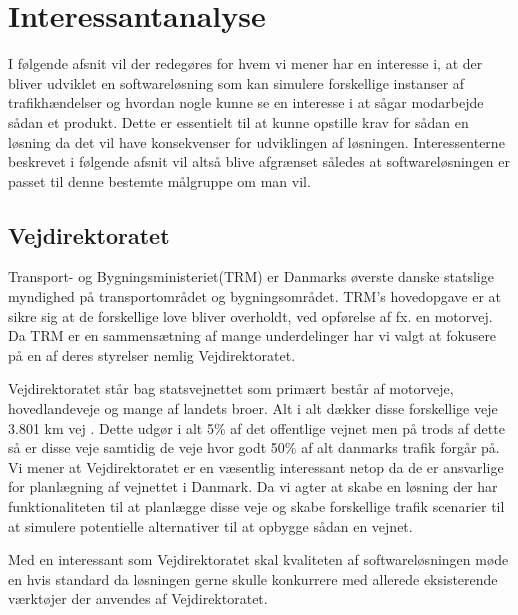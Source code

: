 \chapter{Interessantanalyse}\label{Interessentanalyse}

I følgende afsnit vil der redegøres for hvem vi mener har en interesse i, at der bliver udviklet en softwareløsning som kan simulere forskellige instanser af trafikhændelser og hvordan nogle kunne se en interesse i at sågar modarbejde sådan et produkt. Dette er essentielt til at kunne opstille krav for sådan en løsning da det vil have konsekvenser for udviklingen af løsningen. Interessenterne beskrevet i følgende afsnit vil altså blive afgrænset således at softwareløsningen er passet til denne bestemte målgruppe om man vil.

\section {Vejdirektoratet}\label{TRM}

Transport- og Bygningsministeriet(TRM) er Danmarks øverste danske statslige myndighed på transportområdet og bygningsområdet. TRM’s hovedopgave er at sikre sig at de forskellige love bliver overholdt, ved opførelse af fx. en motorvej. Da TRM er en sammensætning af mange underdelinger har vi valgt at fokusere på en af deres styrelser nemlig Vejdirektoratet.

\vspace{5mm}

Vejdirektoratet står bag statsvejnettet som primært består af motorveje, hovedlandeveje og mange af landets broer. Alt i alt dækker disse forskellige veje 3.801 km vej \cite{Vejdirektoratet}. Dette udgør i alt 5\% af det offentlige vejnet men på trods af dette så er disse veje samtidig de veje hvor godt 50\% af alt danmarks trafik forgår på. Vi mener at Vejdirektoratet er en væsentlig interessant netop da de er ansvarlige for planlægning af vejnettet i Danmark. Da vi agter at skabe en løsning der har funktionaliteten til at planlægge disse veje og skabe forskellige trafik scenarier til at simulere potentielle alternativer til at opbygge sådan en vejnet.

\vspace{5mm}

Med en interessant som Vejdirektoratet skal kvaliteten af softwareløsningen møde en hvis standard da løsningen gerne skulle konkurrere med allerede eksisterende værktøjer der anvendes af Vejdirektoratet.

